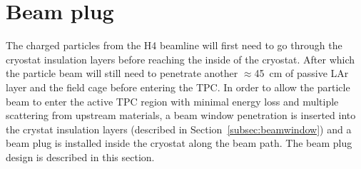 \section{Beam plug}
\label{sec:beamplug}
The charged particles from the H4 beamline will first need to go through the cryostat insulation layers before reaching the inside of the cryostat. After which the particle beam will still need to penetrate another $\approx$45~cm of passive LAr layer and the field cage before entering the TPC. In order to allow the particle beam to enter the active TPC region with minimal energy loss and multiple scattering from upstream materials, a beam window penetration is inserted into the crystat insulation layers (described in Section~\ref{subsec:beamwindow}) and a beam plug is installed inside the cryostat along the beam path. The beam plug design is described in this section.

